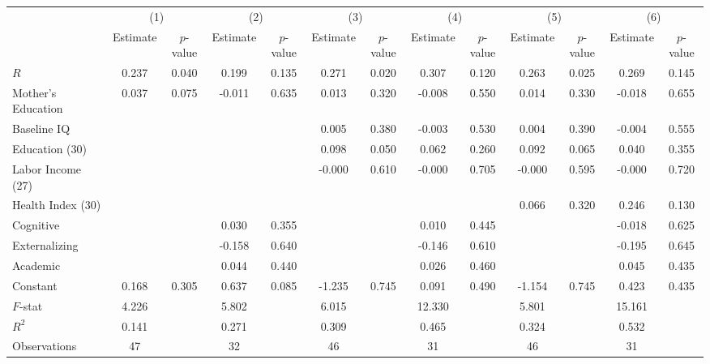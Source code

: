 \begin{table}[htbp]
\begin{tabular}{lcccccccccccc} \toprule
 & \multicolumn{2}{c}{(1)}  &  \multicolumn{2}{c}{(2)}  &  \multicolumn{2}{c}{(3)}  &  \multicolumn{2}{c}{(4)}  & \multicolumn{2}{c}{(5)} & \multicolumn{2}{c}{(6)} \\  
 & Estimate & $p$-value & Estimate & $p$-value & Estimate & $p$-value & Estimate & $p$-value & Estimate & $p$-value & Estimate & $p$-value \\ \midrule 
$R$ &     0.237 &     0.040 &     0.199 &     0.135 &     0.271 &     0.020 &     0.307 &     0.120 &     0.263 &     0.025 &     0.269 &     0.145 \\  
Mother's Education &     0.037 &     0.075 &    -0.011 &     0.635 &     0.013 &     0.320 &    -0.008 &     0.550 &     0.014 &     0.330 &    -0.018 &     0.655 \\  
Baseline IQ &         &         &         &         &     0.005 &     0.380 &    -0.003 &     0.530 &     0.004 &     0.390 &    -0.004 &     0.555 \\  
Education (30) &         &         &         &         &     0.098 &     0.050 &     0.062 &     0.260 &     0.092 &     0.065 &     0.040 &     0.355 \\  
Labor Income (27) &         &         &          &          &    -0.000 &     0.610 &    -0.000 &     0.705 &    -0.000 &     0.595 &    -0.000 &     0.720 \\  
Health Index (30) &          &         &          &         &         &         &         &         &     0.066 &     0.320 &     0.246 &     0.130 \\  
Cognitive &          &          &     0.030 &     0.355 &         &         &     0.010 &     0.445 &         &         &    -0.018 &     0.625 \\  
Externalizing &         &         &    -0.158 &     0.640 &         &         &    -0.146 &     0.610 &         &         &    -0.195 &     0.645 \\  
Academic &         &         &     0.044 &     0.440 &         &         &     0.026 &     0.460 &         &         &     0.045 &     0.435 \\  
Constant &     0.168 &     0.305 &     0.637 &     0.085 &    -1.235 &     0.745 &     0.091 &     0.490 &    -1.154 &     0.745 &     0.423 &     0.435 \\  \midrule
$F$-stat &     4.226 &         &     5.802 &         &     6.015 &         &    12.330 &         &     5.801 &         &    15.161 &         \\   
$R^2$ &     0.141 &         &     0.271 &         &     0.309 &         &     0.465 &         &     0.324 &         &     0.532 &         \\  
Observations &    47&         &    32 &         &    46 &         &    31 &         &    46 &         &    31 &         \\  
\bottomrule \end{tabular}
\end{table}
